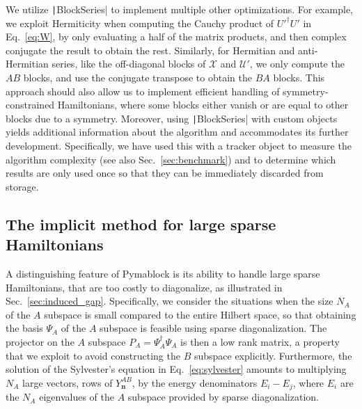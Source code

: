 We utilize \texttt|BlockSeries| to implement multiple other optimizations.
For example, we exploit Hermiticity when computing the Cauchy product of $U'^{\dagger}U'$ in Eq.~\eqref{eq:W}, by only evaluating a half of the matrix products, and then complex conjugate the result to obtain the rest.
Similarly, for Hermitian and anti-Hermitian series, like the off-diagonal blocks of $\mathcal{X}$ and $\mathcal{U}'$, we only compute the $AB$ blocks, and use the conjugate transpose to obtain the $BA$ blocks.
This approach should also allow us to implement efficient handling of symmetry-constrained Hamiltonians, where some blocks either vanish or are equal to other blocks due to a symmetry.
Moreover, using \texttt|BlockSeries| with custom objects yields additional information about the algorithm and accommodates its further development.
Specifically, we have used this with a tracker object to measure the algorithm complexity (see also Sec.~\ref{sec:benchmark}) and to determine which results are only used once so that they can be immediately discarded from storage.

\subsection{The implicit method for large sparse Hamiltonians}
\label{sec:implicit}

A distinguishing feature of Pymablock is its ability to handle large sparse Hamiltonians, that are too costly to diagonalize, as illustrated in Sec.~\ref{sec:induced_gap}.
Specifically, we consider the situations when the size $N_A$ of the $A$ subspace is small compared to the entire Hilbert space, so that obtaining the basis $\Psi_A$ of the $A$ subspace is feasible using sparse diagonalization.
The projector on the $A$ subspace $P_A = \Psi_A^\dagger \Psi_A$ is then a low rank matrix, a property that we exploit to avoid constructing the $B$ subspace explicitly.
Furthermore, the solution of the Sylvester's equation in Eq.~\ref{eq:sylvester} amounts to multiplying $N_A$ large vectors, rows of $Y_{\mathbf{n}}^{AB}$, by the energy denominators $E_i - E_j$, where $E_i$ are the $N_A$ eigenvalues of the $A$ subspace provided by sparse diagonalization.

